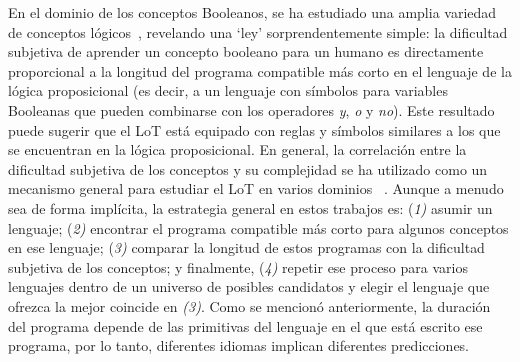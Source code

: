 
En el dominio de los conceptos Booleanos, se ha estudiado una amplia variedad de conceptos lógicos~\cite{feldman2003simplicity}, revelando una `ley' sorprendentemente simple: la dificultad subjetiva de aprender un concepto booleano para un humano es directamente proporcional a la longitud del programa compatible más corto en el lenguaje de la lógica proposicional (es decir, a un lenguaje con símbolos para variables Booleanas que pueden combinarse con los operadores \textit{y}, \textit{o} y \textit{no}). Este resultado puede sugerir que el LoT está equipado con reglas y símbolos similares a los que se encuentran en la lógica proposicional. En general, la correlación entre la dificultad subjetiva de los conceptos y su complejidad se ha utilizado como un mecanismo general para estudiar el LoT en varios dominios ~\cite{piantadosi2016logical,leeuwenberg1971perceptual,amalric2017language,romano2018bayesian,lupyan2007language}. Aunque a menudo sea de forma implícita, la estrategia general en estos trabajos es: (\textit{1)} asumir un lenguaje; (\textit{2)} encontrar el programa compatible más corto para algunos conceptos en ese lenguaje; (\textit{3)} comparar la longitud de estos programas con la dificultad subjetiva de los conceptos; y finalmente, (\textit{4)} repetir ese proceso para varios lenguajes dentro de un universo de posibles candidatos y elegir el lenguaje que ofrezca la mejor coincide en \textit{(3)}. Como se mencionó anteriormente, la duración del programa depende de las primitivas del lenguaje en el que está escrito ese programa, por lo tanto, diferentes idiomas implican diferentes predicciones.

